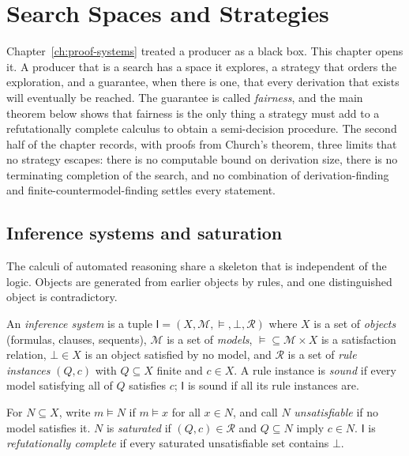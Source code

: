 \chapter{Search Spaces and Strategies}
\label{ch:search}

Chapter~\ref{ch:proof-systems} treated a producer as a black box. This chapter opens it. A producer that is a search has a space it explores, a strategy that orders the exploration, and a guarantee, when there is one, that every derivation that exists will eventually be reached. The guarantee is called \emph{fairness}, and the main theorem below shows that fairness is the only thing a strategy must add to a refutationally complete calculus to obtain a semi-decision procedure. The second half of the chapter records, with proofs from Church's theorem, three limits that no strategy escapes: there is no computable bound on derivation size, there is no terminating completion of the search, and no combination of derivation-finding and finite-countermodel-finding settles every statement.

\section{Inference systems and saturation}

The calculi of automated reasoning share a skeleton that is independent of the logic. Objects are generated from earlier objects by rules, and one distinguished object is contradictory.

\begin{definition}
\label{def:inference-system}
An \emph{inference system} is a tuple $\mathsf{I}=(X,\mathcal{M},\models,\bot,\mathcal{R})$ where $X$ is a set of \emph{objects} (formulas, clauses, sequents), $\mathcal{M}$ is a set of \emph{models}, ${\models}\subseteq\mathcal{M}\times X$ is a satisfaction relation, $\bot\in X$ is an object satisfied by no model, and $\mathcal{R}$ is a set of \emph{rule instances} $(Q,c)$ with $Q\subseteq X$ finite and $c\in X$. A rule instance is \emph{sound} if every model satisfying all of $Q$ satisfies $c$; $\mathsf{I}$ is sound if all its rule instances are.

For $N\subseteq X$, write $m\models N$ if $m\models x$ for all $x\in N$, and call $N$ \emph{unsatisfiable} if no model satisfies it. $N$ is \emph{saturated} if $(Q,c)\in\mathcal{R}$ and $Q\subseteq N$ imply $c\in N$. $\mathsf{I}$ is \emph{refutationally complete} if every saturated unsatisfiable set contains $\bot$.
\end{definition}

